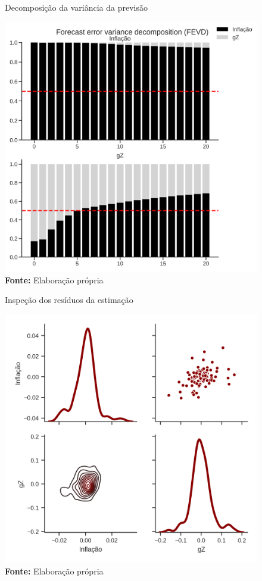 \begin{figure}[htb]
	\centering
	\caption{Decomposição da variância da previsão}
	\label{fevd}
	\includegraphics[width = \textwidth]{../../Modelo/SeriesTemporais/figs/FEVD_VECMpython_Infla.png}
	\caption*{\textbf{Fonte:} Elaboração própria}
\end{figure}



\begin{figure}[htb]
	\centering
	\caption{Inspeção dos resíduos da estimação}
	\label{residuos_infla}
	\includegraphics[height=.4\textheight]{../../Modelo/SeriesTemporais/figs/Residuos_4VECM_Infla.png}
	\caption*{\textbf{Fonte:} Elaboração própria}
\end{figure}


